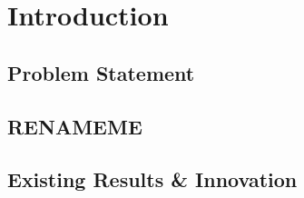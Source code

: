 \chapter{Introduction}\label{ch:introduction}


\section{Problem Statement}


\section{RENAMEME}


\section {Existing Results \& Innovation}\label{sec:existing_results_innovation}

